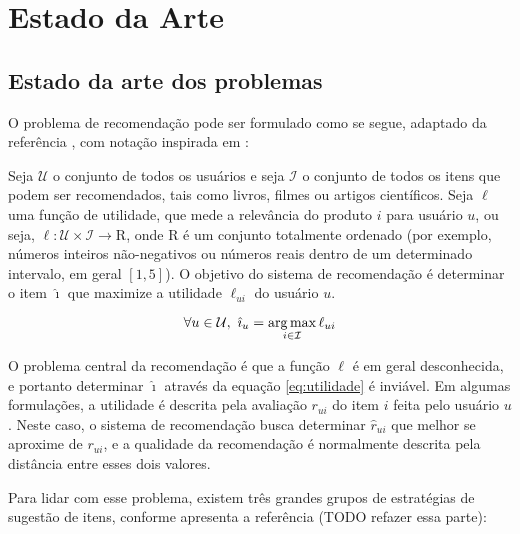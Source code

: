 \chapter[Estado da arte]{Estado da Arte}
\label{chap:estado_da_arte}

\section{Estado da arte dos problemas} %
\label{sec:estado_da_arte_dos_problemas}

O problema de recomendação pode ser formulado como se segue, adaptado da referência \cite{adomavicius2005toward}, com notação inspirada em \cite{symeonidis2007feature}: 

Seja $\mathcal{U}$ o conjunto de todos os usuários e seja $\mathcal{I}$ o conjunto de todos os itens que podem ser recomendados, tais como livros, filmes ou artigos científicos. Seja $\ell$ uma função de utilidade, que mede a relevância do produto $i$ para usuário $u$, ou seja, $\ell: \mathcal{U} \times \mathcal{I} \rightarrow \mathrm{R}$, onde $\mathrm{R}$ é um  conjunto totalmente ordenado (por exemplo, números inteiros não-negativos ou números reais dentro de um determinado intervalo, em geral $[1, 5]$). O objetivo do sistema de recomendação é determinar o item $\hat{\imath}$ que maximize a utilidade $\ell_{ui}$ do usuário $u$.

\begin{equation} 
\label{eq:utilidade}
\forall u \in \mathcal{U}, ~ \hat{\imath}_u = \operatorname*{arg\,max}_{i \in \mathcal{I}}{\ell_{ui}}
\end{equation}

O problema central da recomendação é que a função $\ell$ é em geral desconhecida, e portanto determinar $\hat{\imath}$ através da equação \ref{eq:utilidade} é inviável. Em algumas formulações, a utilidade é descrita pela avaliação $r_{ui}$ do item $i$ feita pelo usuário $u$. Neste caso, o sistema de recomendação busca determinar $\hat{r}_{ui}$ que melhor se aproxime de $r_{ui}$, e a qualidade da recomendação é normalmente descrita pela distância entre esses dois valores. 

Para lidar com esse problema,  existem três grandes grupos de estratégias de sugestão de itens, conforme apresenta a referência \cite{balabanovic97fab} (TODO refazer essa parte):


